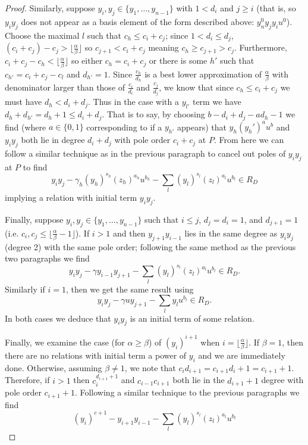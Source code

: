 \documentclass{amsart}
\theoremstyle{plain}
\theoremstyle{definition}
\theoremstyle{remark}
\numberwithin{equation}{section}
\begin{document}
\begin{proof}
Similarly, suppose $y_i,y_j\in \{y_1, \ldots ,y_{n-1}\}$ with $1<d_i$ and $j\ge i$ (that is, so $y_iy_j$ does not appear as a basis element of the form described above: $y_n^0 y_jy_i u^0$).  Choose the maximal $l$ such that $c_h\le c_i+c_j$; since $1<d_i\le d_j$, $(c_i+c_j)-c_j>\lfloor \frac{\alpha}{\beta}\rfloor$ so $c_{j+1} < c_i + c_j$ meaning $c_h \ge c_{j+1} > c_j$.  Furthermore, $c_i + c_j - c_h<\lfloor \frac{\alpha}{\beta} \rfloor$ so either $c_h=c_i+c_j$ or there is some $h'$ such that $c_{h'}=c_i+c_j-c_l$ and $d_{h'}=1$.  Since $\frac{c_h}{d_h}$ is a best lower approximation of $\frac{\alpha}{\beta}$ with denominator larger than those of $\frac{c_i}{d_i}$ and $\frac{c_j}{d_j}$, we know that since $c_h\le c_i+c_j$ we must have $d_h<d_i+d_j$.  Thus in the case with a $y_{l'}$ term we have $d_h + d_{h'} = d_h + 1 \le d_i + d_j$.  That is to say, by choosing $b-d_i+d_j-ad_h-1$ we find (where $a\in\{0,1\}$ corresponding to if a $y_{h'}$ appears) that $y_h(y_h')^au^b$ and $y_iy_j$ both lie in degree $d_i+d_j$ with pole order $c_i+c_j$ at $P$.  From here we can follow a similar technique as in the previous paragraph to cancel out poles of $y_iy_j$ at $P$ to find
\[
	y_iy_j-\gamma_h (y_h)^{s_h}(z_{h})^{a_h}u^{b_h}-\sum_l (y_l)^{s_l} (z_{l})^{a_l}u^{b_l}\in R_D
\]
implying a relation with initial term $y_i y_j$.  

Finally, suppose $y_i, y_j\in \{y_1, \ldots ,y_{n-1}\}$ such that $i\le j$, $d_j=d_i=1$, and $d_{j+1}=1$ (i.e. $c_i, c_j \le \lfloor \frac{\alpha}{\beta} - 1 \rfloor$).  If $i>1$ and then $y_{j+1}y_{i-1}$ lies in the same degree as $y_iy_j$ (degree 2) with the same pole order; following the same method as the previous two paragraphs we find
\[
	y_i y_j - \gamma y_{i-1} y_{j+1} - \sum_{l} (y_l)^{s_l} (z_l)^{a_l}u^{b_l}\in R_D.
\]
Similarly if $i=1$, then we get the same result using
\[
	y_i y_j - \gamma u y_{j+1} - \sum_l y_l u^{b_l} \in R_D.
\]
In both cases we deduce that $y_iy_j$ is an initial term of some relation.

Finally, we examine the case (for $\alpha \ge \beta$) of $(y_i)^{i + 1}$ when $i=\lfloor \frac{\alpha}{\beta}\rfloor$.  If $\beta=1$, then there are no relations with initial term a power of $y_i$ and we are immediately done.  Otherwise, assuming $\beta\ne 1$, we note that $c_id_{i+1}=c_{i+1}d_i+1=c_{i+1}+1$.   Therefore, if $i>1$ then $c_i^{d_{i+1}+1}$ and $c_{i-1} c_{i+1}$ both lie in the $d_{i+1}+1$ degree with pole order $c_{i+1}+1$.  Following a similar technique to the previous paragraphs we find
\[
	(y_{i})^{c+1} - y_{i+1} y_{i-1} - \sum_l (y_l)^{s_l}(z_l)^{a_l} u^{b_l}
\]



\end{proof}
\end{document}
